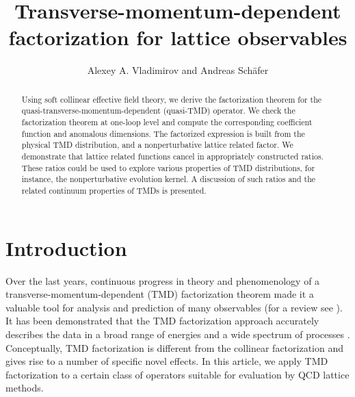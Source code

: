 \documentclass[a4paper, amsfonts, amssymb, amsmath, reprint, showkeys, nofootinbib, twoside]{revtex4-1}
\renewcommand{\(}{\left(}
\renewcommand{\)}{\right)}
\renewcommand{\[}{\left[}
\renewcommand{\]}{\right]}
\begin{document}
\title{Transverse-momentum-dependent factorization for lattice observables}
\author{Alexey A. Vladimirov and Andreas Sch\"afer}

\begin{abstract}
Using soft collinear effective field theory, we derive the factorization theorem for the quasi-transverse-momentum-dependent (quasi-TMD) operator. We check the factorization theorem at one-loop level and compute the corresponding coefficient function and anomalous dimensions. The factorized expression is built from the physical TMD distribution, and a nonperturbative lattice related factor. We demonstrate that lattice related functions cancel in appropriately constructed ratios. These ratios could be used to explore various properties of TMD distributions, for instance, the nonperturbative evolution kernel. A discussion of such ratios and the related continuum properties of TMDs is presented.
\end{abstract}
\maketitle

\section{Introduction}

Over the last years, continuous progress in theory and phenomenology of a transverse-momentum-dependent (TMD) factorization theorem made it a valuable tool for analysis and prediction of many observables (for a review see \cite{Angeles-Martinez:2015sea}). It has been demonstrated that the TMD factorization approach accurately describes the data in a broad range of energies and a wide spectrum of processes \cite{Bacchetta:2017gcc,Scimemi:2017etj,Vladimirov:2019bfa,Scimemi:2019cmh,Bacchetta:2019sam}. Conceptually, TMD factorization \cite{Collins:2011zzd,GarciaEchevarria:2011rb} is different from the collinear factorization and gives rise to a number of specific novel effects. In this article, we apply TMD factorization to a certain class of operators suitable for evaluation by QCD lattice methods.
\end{document}
